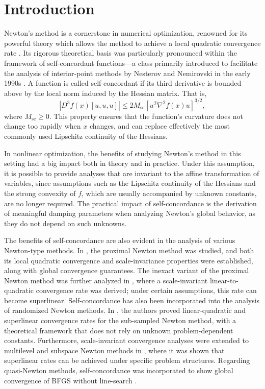 \documentclass[sn-mathphys-num]{sn-jnl}%
\theoremstyle{thmstyleone}%
\theoremstyle{thmstyletwo}%
\theoremstyle{thmstylethree}%
\numberwithin{equation}{section}
\begin{document}
\section{Introduction}
Newton's method is a cornerstone in numerical optimization, renowned for its powerful theory which allows the method to achieve a local quadratic convergence rate \cite{nesterov2018lectures, boyd2004convex}. Its rigorous theoretical basis was particularly pronounced within the framework of self-concordant functions---a class primarily introduced to facilitate the analysis of interior-point methods by Nesterov and Nemirovski in the early 1990s \cite{nesterov1994interior}. A function is called self-concordant if its third derivative is bounded above by the local norm induced by the Hessian matrix. That is,
\begin{equation} \label{def: self concordant func}
|D^3 f(x)[u,u,u]| \leq 2 M_\text{sc} \left[u^T \nabla^2 f(x) u \right]^{3/2},    
\end{equation}
where $M_\text{sc} \geq 0$. This property ensures that the function's curvature does not change too rapidly when $x$ changes, and can replace effectively the most commonly used Lipschitz continuity of the Hessians.

In nonlinear optimization, the benefits of studying Newton's method in this setting had a big impact both in theory and in practice. Under this assumption, it is possible to provide analyses that are invariant to the affine transformation of variables, since assumptions such as the Lipschitz continuity of the Hessians and the strong convexity of $f$, which are usually accompanied by unknown constants, are no longer required. The practical impact of self-concordance is the derivation of meaningful damping parameters when analyzing Newton's global behavior, as they do not depend on such unknowns. 

The benefits of self-concordance are also evident in the analysis of various Newton-type methods. In \cite{tran2015composite}, the proximal Newton method was studied, and both its local quadratic convergence and scale-invariance properties were established, along with global convergence guarantees. The inexact variant of the proximal Newton method was further analyzed in \cite{li2017inexact}, where a scale-invariant linear-to-quadratic convergence rate was derived; under certain assumptions, this rate can become superlinear. Self-concordance has also been incorporated into the analysis of randomized Newton methods. In \cite{pilanci2017newton}, the authors proved linear-quadratic and superlinear convergence rates for the sub-sampled Newton method, with a theoretical framework that does not rely on unknown problem-dependent constants. Furthermore, scale-invariant convergence analyses were extended to multilevel and subspace Newton methods in \cite{tsipinakis2023lowrank, tsipinakis2024multilevel}, where it was shown that superlinear rates can be achieved under specific problem structures. Regarding quasi-Newton methods, self-concordance was incorporated to show global convergence of BFGS without line-search \cite{gao2019quasi}.
\end{document}
